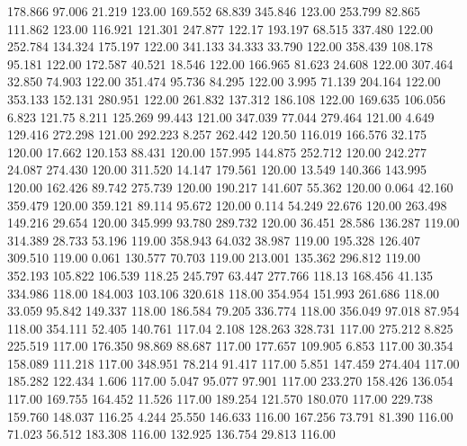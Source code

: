  178.866   97.006   21.219       123.00
 169.552   68.839  345.846       123.00
 253.799   82.865  111.862       123.00
 116.921  121.301  247.877       122.17
 193.197   68.515  337.480       122.00
 252.784  134.324  175.197       122.00
 341.133   34.333   33.790       122.00
 358.439  108.178   95.181       122.00
 172.587   40.521   18.546       122.00
 166.965   81.623   24.608       122.00
 307.464   32.850   74.903       122.00
 351.474   95.736   84.295       122.00
   3.995   71.139  204.164       122.00
 353.133  152.131  280.951       122.00
 261.832  137.312  186.108       122.00
 169.635  106.056    6.823       121.75
   8.211  125.269   99.443       121.00
 347.039   77.044  279.464       121.00
   4.649  129.416  272.298       121.00
 292.223    8.257  262.442       120.50
 116.019  166.576   32.175       120.00
  17.662  120.153   88.431       120.00
 157.995  144.875  252.712       120.00
 242.277   24.087  274.430       120.00
 311.520   14.147  179.561       120.00
  13.549  140.366  143.995       120.00
 162.426   89.742  275.739       120.00
 190.217  141.607   55.362       120.00
   0.064   42.160  359.479       120.00
 359.121   89.114   95.672       120.00
   0.114   54.249   22.676       120.00
 263.498  149.216   29.654       120.00
 345.999   93.780  289.732       120.00
  36.451   28.586  136.287       119.00
 314.389   28.733   53.196       119.00
 358.943   64.032   38.987       119.00
 195.328  126.407  309.510       119.00
   0.061  130.577   70.703       119.00
 213.001  135.362  296.812       119.00
 352.193  105.822  106.539       118.25
 245.797   63.447  277.766       118.13
 168.456   41.135  334.986       118.00
 184.003  103.106  320.618       118.00
 354.954  151.993  261.686       118.00
  33.059   95.842  149.337       118.00
 186.584   79.205  336.774       118.00
 356.049   97.018   87.954       118.00
 354.111   52.405  140.761       117.04
   2.108  128.263  328.731       117.00
 275.212    8.825  225.519       117.00
 176.350   98.869   88.687       117.00
 177.657  109.905    6.853       117.00
  30.354  158.089  111.218       117.00
 348.951   78.214   91.417       117.00
   5.851  147.459  274.404       117.00
 185.282  122.434    1.606       117.00
   5.047   95.077   97.901       117.00
 233.270  158.426  136.054       117.00
 169.755  164.452   11.526       117.00
 189.254  121.570  180.070       117.00
 229.738  159.760  148.037       116.25
   4.244   25.550  146.633       116.00
 167.256   73.791   81.390       116.00
  71.023   56.512  183.308       116.00
 132.925  136.754   29.813       116.00
